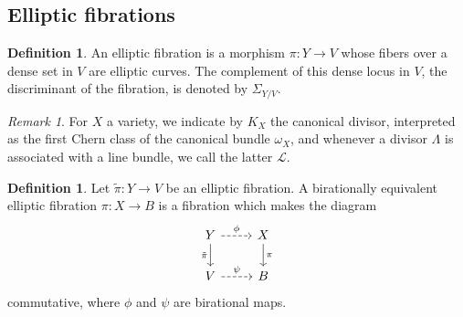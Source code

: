 \documentclass[11pt]{amsart}
\theoremstyle{definition}
\newtheorem{definition}[theorem]{Definition}
\theoremstyle{definition}
\theoremstyle{remark}
\newtheorem{remark}[theorem]{Remark}
\theoremstyle{remark}
\theoremstyle{definition}
\theoremstyle{conjecture}
\begin{document}
\subsection{ Elliptic fibrations }

\begin{definition} An elliptic   fibration is a morphism $\pi : Y\rightarrow V$ whose fibers over a dense set in $V$ are elliptic 
	curves. The complement of this dense locus in $V$, the discriminant of the fibration, is  denoted by  $\Sigma_{Y/V}$.
\end{definition}

\begin{remark}
For $X$ a variety, we indicate by $K_X$ the canonical divisor, interpreted as the first Chern class of the canonical bundle $\omega_X$, and whenever a divisor $\Lambda$ is associated with a  line bundle, we call the latter $\mathcal{L}$.
\end{remark}
\begin{definition}\label{def:bireq} Let  $\tilde \pi : Y \rightarrow V$ be an elliptic fibration. A birationally equivalent elliptic fibration $  \pi :  X  \to B $ is a fibration which makes the diagram 
\[
\begin{tikzcd}
Y \arrow[d, "\tilde \pi "'] \arrow[r, dashed,"\phi"] & X \arrow[d, "\pi"] \\
V \arrow[r, dashed,"\psi" ] & B
\end{tikzcd}
\]
 commutative, where $\phi$   and $\psi$ are birational maps.
\end{definition}
\end{document}
